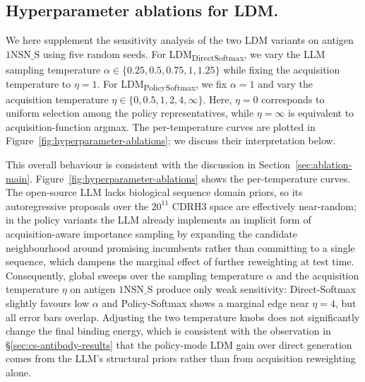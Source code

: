 \subsection{Hyperparameter ablations for LDM.}
\label{app:abl-hyper-ldm}

We here supplement the sensitivity analysis of the two LDM variants on antigen $1\mathrm{NSN\_S}$ using five random seeds. For LDM\textsubscript{Direct}\textsubscript{Softmax}, we vary the LLM sampling temperature $\alpha\in\{0.25,0.5,0.75,1,1.25\}$ while fixing the acquisition temperature to $\eta=1$. For LDM\textsubscript{Policy}\textsubscript{Softmax}, we fix $\alpha=1$ and vary the acquisition temperature $\eta\in\{0,0.5,1,2,4,\infty\}$. Here, $\eta=0$ corresponds to uniform selection among the policy representatives, while $\eta=\infty$ is equivalent to acquisition-function argmax. The per-temperature curves are plotted in Figure~\ref{fig:hyperparameter-ablations}; we discuss their interpretation below.

This overall behaviour is consistent with the discussion in Section~\ref{sec:ablation-main}. Figure~\ref{fig:hyperparameter-ablations} shows the per-temperature curves. The open-source LLM lacks biological sequence domain priors, so its autoregressive proposals over the $20^{11}$ CDRH3 space are effectively near-random; in the policy variants the LLM already implements an implicit form of acquisition-aware importance sampling by expanding the candidate neighbourhood around promising incumbents rather than committing to a single sequence, which dampens the marginal effect of further reweighting at test time. Consequently, global sweeps over the sampling temperature $\alpha$ and the acquisition temperature $\eta$ on antigen $1\mathrm{NSN\_S}$ produce only weak sensitivity: Direct-Softmax slightly favours low $\alpha$ and Policy-Softmax shows a marginal edge near $\eta=4$, but all error bars overlap. Adjusting the two temperature knobs does not significantly change the final binding energy, which is consistent with the observation in \S\ref{sec:cs-antibody-results} that the policy-mode LDM gain over direct generation comes from the LLM's structural priors rather than from acquisition reweighting alone.